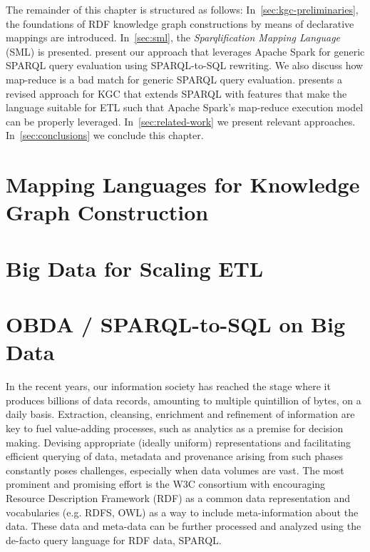 The remainder of this chapter is structured as follows:
In~\cref{sec:kgc-preliminaries}, the foundations of RDF knowledge graph constructions by means of declarative mappings are introduced.
In~\cref{sec:sml}, the \emph{Sparqlification Mapping Language} (SML) is presented.
 present our approach that leverages Apache Spark for generic SPARQL query evaluation using SPARQL-to-SQL rewriting.
We also discuss how map-reduce is a bad match for generic SPARQL query evaluation.
 presents a revised approach for KGC that extends SPARQL with features that make the language suitable for ETL such
that Apache Spark's map-reduce execution model can be properly leveraged.
In~\cref{sec:related-work} we present relevant approaches.
In~\cref{sec:conclusions} we conclude this chapter.

\section{Mapping Languages for Knowledge Graph Construction}

\section{Big Data for Scaling ETL}

\section{OBDA / SPARQL-to-SQL on Big Data}
In the recent years, our information society has reached the stage where it produces billions of data records, amounting to multiple quintillion of bytes, on a daily basis.
Extraction, cleansing, enrichment and refinement of information are key to fuel value-adding processes, such as analytics as a premise for decision making.
Devising appropriate (ideally uniform) representations and facilitating efficient querying of data, metadata and provenance arising from such phases constantly poses challenges, especially when data volumes are vast. %
The most prominent and promising effort is the W3C consortium with encouraging Resource Description Framework (RDF) as a common data representation and vocabularies (e.g. RDFS, OWL) as a way to include meta-information about the data.
These data and meta-data can be further processed and analyzed using the de-facto query language for RDF data, SPARQL.

